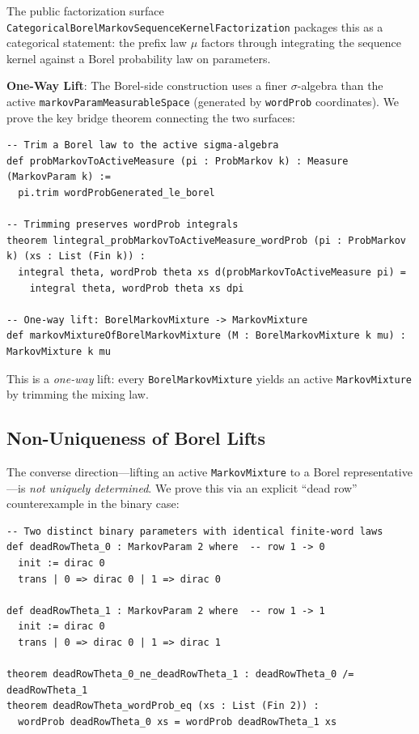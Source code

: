 \documentclass[11pt,a4paper]{article}
\theoremstyle{definition}
\begin{document}
The public factorization surface \texttt{CategoricalBorelMarkovSequenceKernelFactorization}
packages this as a categorical statement: the prefix law $\mu$ factors through
integrating the sequence kernel against a Borel probability law on parameters.

\textbf{One-Way Lift}: The Borel-side construction uses a finer $\sigma$-algebra
than the active \texttt{markovParamMeasurableSpace} (generated by \texttt{wordProb}
coordinates). We prove the key bridge theorem connecting the two surfaces:

\begin{lstlisting}
-- Trim a Borel law to the active sigma-algebra
def probMarkovToActiveMeasure (pi : ProbMarkov k) : Measure (MarkovParam k) :=
  pi.trim wordProbGenerated_le_borel

-- Trimming preserves wordProb integrals
theorem lintegral_probMarkovToActiveMeasure_wordProb (pi : ProbMarkov k) (xs : List (Fin k)) :
  integral theta, wordProb theta xs d(probMarkovToActiveMeasure pi) =
    integral theta, wordProb theta xs dpi

-- One-way lift: BorelMarkovMixture -> MarkovMixture
def markovMixtureOfBorelMarkovMixture (M : BorelMarkovMixture k mu) : MarkovMixture k mu
\end{lstlisting}

This is a \emph{one-way} lift: every \texttt{BorelMarkovMixture} yields an active
\texttt{MarkovMixture} by trimming the mixing law.

\subsection{Non-Uniqueness of Borel Lifts}

The converse direction---lifting an active \texttt{MarkovMixture} to a Borel
representative---is \emph{not uniquely determined}. We prove this via an explicit
``dead row'' counterexample in the binary case:

\begin{lstlisting}
-- Two distinct binary parameters with identical finite-word laws
def deadRowTheta_0 : MarkovParam 2 where  -- row 1 -> 0
  init := dirac 0
  trans | 0 => dirac 0 | 1 => dirac 0

def deadRowTheta_1 : MarkovParam 2 where  -- row 1 -> 1
  init := dirac 0
  trans | 0 => dirac 0 | 1 => dirac 1

theorem deadRowTheta_0_ne_deadRowTheta_1 : deadRowTheta_0 /= deadRowTheta_1
theorem deadRowTheta_wordProb_eq (xs : List (Fin 2)) :
  wordProb deadRowTheta_0 xs = wordProb deadRowTheta_1 xs
\end{lstlisting}
\end{document}
